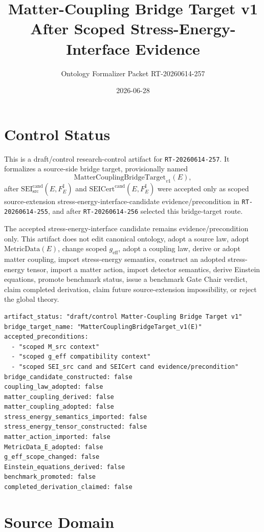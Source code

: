 \documentclass[11pt]{article}
\title{Matter-Coupling Bridge Target v1 After Scoped Stress-Energy-Interface Evidence}
\author{Ontology Formalizer Packet RT-20260614-257}
\date{2026-06-28}
\newcommand{\MetricData}{\mathrm{MetricData}}
\newcommand{\geff}{g_{\mathrm{eff}}}
\newcommand{\SEICand}{\mathrm{SEI}_{\mathrm{src}}^{\mathrm{cand}}}
\newcommand{\SEICertCand}{\mathrm{SEICert}^{\mathrm{cand}}}
\newcommand{\MCBT}{\mathrm{MatterCouplingBridgeTarget}_{v1}}
\begin{document}
\maketitle

\section{Control Status}

This is a draft/control research-control artifact for
\texttt{RT-20260614-257}. It formalizes a source-side bridge target,
provisionally named
\[
  \MCBT(E),
\]
after \(\SEICand(E,F_E^\sharp)\) and
\(\SEICertCand(E,F_E^\sharp)\) were accepted only as scoped
source-extension stress-energy-interface-candidate evidence/precondition in
\texttt{RT-20260614-255}, and after \texttt{RT-20260614-256} selected this
bridge-target route.

The accepted stress-energy-interface candidate remains evidence/precondition
only. This artifact does not edit canonical ontology, adopt a source law,
adopt \(\MetricData(E)\), change scoped \(\geff\), adopt a coupling law,
derive or adopt matter coupling, import stress-energy semantics, construct an
adopted stress-energy tensor, import a matter action, import detector
semantics, derive Einstein equations, promote benchmark status, issue a
benchmark Gate Chair verdict, claim completed derivation, claim future
source-extension impossibility, or reject the global theory.

\begin{verbatim}
artifact_status: "draft/control Matter-Coupling Bridge Target v1"
bridge_target_name: "MatterCouplingBridgeTarget_v1(E)"
accepted_preconditions:
  - "scoped M_src context"
  - "scoped g_eff compatibility context"
  - "scoped SEI_src cand and SEICert cand evidence/precondition"
bridge_candidate_constructed: false
coupling_law_adopted: false
matter_coupling_derived: false
matter_coupling_adopted: false
stress_energy_semantics_imported: false
stress_energy_tensor_constructed: false
matter_action_imported: false
MetricData_E_adopted: false
g_eff_scope_changed: false
Einstein_equations_derived: false
benchmark_promoted: false
completed_derivation_claimed: false
\end{verbatim}

\section{Source Domain}
\end{document}
